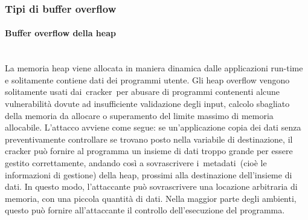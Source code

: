\documentclass{article}
\begin{document}
\subsubsection{Tipi di buffer overflow}
\paragraph{Buffer overflow della heap}
\noindent
\\
La memoria heap viene allocata in maniera dinamica dalle applicazioni run-time e solitamente contiene 
dati dei programmi utente. Gli heap overflow vengono solitamente usati dai cracker per abusare di 
programmi contenenti alcune vulnerabilità dovute ad insufficiente validazione degli input, calcolo 
sbagliato della memoria da allocare o superamento del limite massimo di memoria allocabile. 
L'attacco avviene come segue: se un'applicazione copia dei dati senza preventivamente controllare 
se trovano posto nella variabile di destinazione, il cracker può fornire al programma un insieme di 
dati troppo grande per essere gestito correttamente, andando così a sovrascrivere i metadati (cioè le 
informazioni di gestione) della heap, prossimi alla destinazione dell'insieme di dati. In questo modo, 
l'attaccante può sovrascrivere una locazione arbitraria di memoria, con una piccola quantità di dati. 
Nella maggior parte degli ambienti, questo può fornire all'attaccante il controllo dell'esecuzione del 
programma. 
\end{document}
